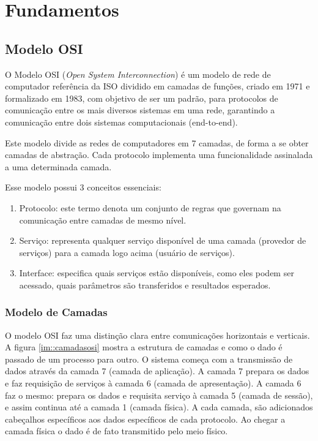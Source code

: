 \chapter{Fundamentos\label{chap:FundamentacaoMatematica}}


\section{Modelo OSI}

O Modelo OSI (\textit{Open System Interconnection}) é um modelo de rede de computador referência da ISO dividido em camadas de funções, criado em 1971 e formalizado em 1983, com objetivo de ser um padrão, para protocolos de comunicação entre os mais diversos sistemas em uma rede, garantindo a comunicação entre dois sistemas computacionais (end-to-end).

Este modelo divide as redes de computadores em 7 camadas, de forma a se obter camadas de abstração. Cada protocolo implementa uma funcionalidade assinalada a uma determinada camada.

Esse modelo possui 3 conceitos essenciais:

\begin{enumerate}
\item Protocolo: este termo denota um conjunto de regras que governam na comunicação entre camadas de mesmo nível. 
\item Serviço: representa qualquer serviço disponível de uma camada (provedor de serviços) para a camada logo acima (usuário de serviços).
\item Interface: especifica quais serviços estão disponíveis, como eles podem ser acessado, quais parâmetros são transferidos e resultados esperados.
\end{enumerate}

\subsection{Modelo de Camadas}

O modelo OSI faz uma distinção clara entre comunicações horizontais e verticais. A figura \ref{im::camadasosi} mostra a estrutura de camadas e como o dado é passado de um processo para outro. O sistema começa com a transmissão de dados através da camada 7 (camada de aplicação). A camada 7 prepara os dados e faz requisição de serviços à camada 6 (camada de apresentação). A camada 6 faz o mesmo: prepara os dados e requisita serviço à camada 5 (camada de sessão), e assim continua até a camada 1 (camada física). A cada camada, são adicionados cabeçalhos específicos aos dados específicos de cada protocolo. Ao chegar a camada física o dado é de fato transmitido pelo meio físico.

